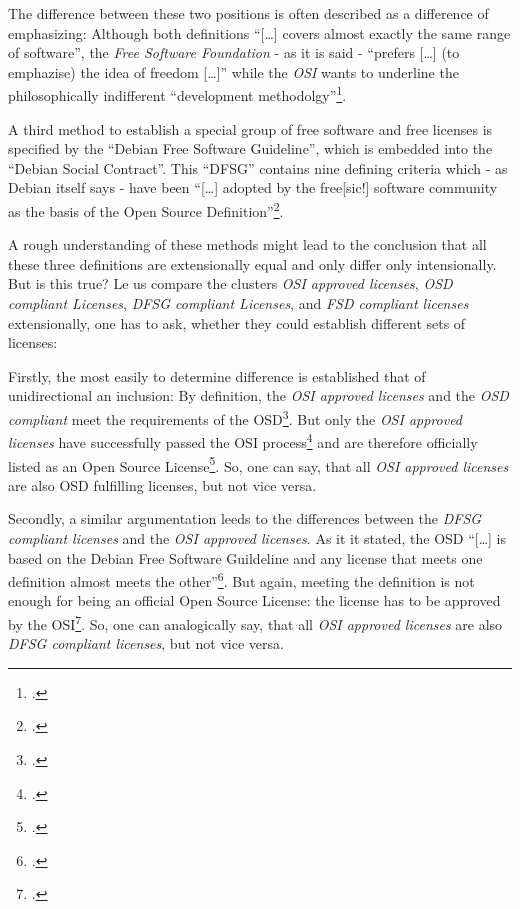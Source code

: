 The difference between these two positions is often described as a difference of
emphasizing: Although both definitions \enquote{[\ldots] covers almost exactly
the same range of software}, the \emph{Free Software Foundation} - as it is said
- \enquote{prefers [\ldots] (to emphazise) the idea of freedom [\ldots]} while
the \emph{OSI} wants to underline the philosophically indifferent
\enquote{development methodolgy}\footcite[pars pro toto: cf.][232]{Fogel2006a}.

A third method to establish a special group of free software and free licenses
is specified by the \enquote{Debian Free Software Guideline}, which is embedded
into the \enquote{Debian Social Contract}. This \enquote{DFSG} contains nine
defining criteria which - as Debian itself says - have been \enquote{[\ldots]
adopted by the free[sic!] software community as the basis of the Open Source
Definition}\footcite[cf.][wp]{DFSG2013a}.

A rough understanding of these methods might lead to the conclusion that all
these three definitions are extensionally equal and only differ only
intensionally. But is this true? Le us compare the clusters \emph{OSI approved
licenses}, \emph{OSD compliant Licenses}, \emph{DFSG compliant Licenses}, and
\emph{FSD compliant licenses} extensionally, one has to ask, whether they could
establish different sets of licenses:

Firstly, the most easily to determine difference is established that of
unidirectional an inclusion: By definition, the \emph{OSI approved licenses} and
the \emph{OSD compliant } meet the requirements of the OSD\footcite[cf.][\nopage
wp]{OSI2012a}. But only the \emph{OSI approved licenses} have successfully
passed the OSI process\footcite[cf.][wp]{OSI2012a} and are therefore officially
listed as an Open Source License\footcite[cf.][\nopage wp]{OSI2012b}. So, one
can say, that all \emph{OSI approved licenses} are also OSD fulfilling licenses,
but not vice versa.

Secondly, a similar argumentation leeds to the differences between the
\emph{DFSG compliant licenses} and the \emph{OSI approved licenses}. As it it
stated, the OSD \enquote{[\ldots] is based on the Debian Free Software
Guildeline and any license that meets one definition almost meets the
other}\footcite[cf.][233]{Fogel2006a}. But again, meeting the definition is not
enough for being an official Open Source License: the license has to be approved
by the OSI\footcite[cf.][\nopage wp]{OSI2012b}. So, one can analogically say,
that all \emph{OSI approved licenses} are also \emph{DFSG compliant licenses},
but not vice versa.

